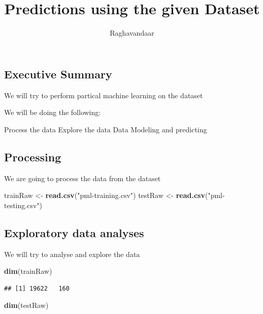 \documentclass[
]{article}
\title{Predictions using the given Dataset}
\author{Raghavandaar}
\date{}
\newenvironment{Shaded}{\begin{snugshade}}{\end{snugshade}}
\newcommand{\KeywordTok}[1]{\textcolor[rgb]{0.13,0.29,0.53}{\textbf{#1}}}
\newcommand{\NormalTok}[1]{#1}
\newcommand{\StringTok}[1]{\textcolor[rgb]{0.31,0.60,0.02}{#1}}
\begin{document}
\maketitle

\hypertarget{executive-summary}{%
\subsection{Executive Summary}\label{executive-summary}}

We will try to perform partical machine learning on the dataset

We will be doing the following:

Process the data Explore the data Data Modeling and predicting

\hypertarget{processing}{%
\subsection{Processing}\label{processing}}

We are going to process the data from the dataset

\begin{Shaded}
\begin{Highlighting}[]
\NormalTok{trainRaw <-}\StringTok{ }\KeywordTok{read.csv}\NormalTok{(}\StringTok{"pml-training.csv"}\NormalTok{)}
\NormalTok{testRaw <-}\StringTok{ }\KeywordTok{read.csv}\NormalTok{(}\StringTok{"pml-testing.csv"}\NormalTok{)}
\end{Highlighting}
\end{Shaded}

\hypertarget{exploratory-data-analyses}{%
\subsection{Exploratory data analyses}\label{exploratory-data-analyses}}

We will try to analyse and explore the data

\begin{Shaded}
\begin{Highlighting}[]
\KeywordTok{dim}\NormalTok{(trainRaw)}
\end{Highlighting}
\end{Shaded}

\begin{verbatim}
## [1] 19622   160
\end{verbatim}

\begin{Shaded}
\begin{Highlighting}[]
\KeywordTok{dim}\NormalTok{(testRaw)}
\end{Highlighting}
\end{Shaded}
\end{document}
